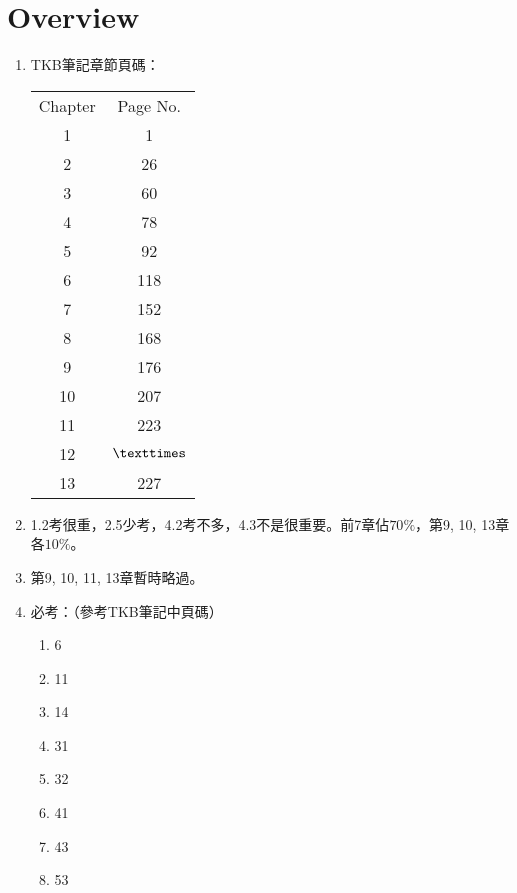 \section{Overview}

\begin{enumerate}
    \item TKB筆記\cite{4}章節頁碼：
    \begin{table}[H]
        \centering
        \begin{tabular}{|c|c|}
            \hline
            Chapter & Page No. \\
            \Xhline{2\arrayrulewidth}
            1 & 1 \\
            \hline
            2 & 26 \\
            \hline
            3 & 60 \\
            \hline
            4 & 78 \\
            \hline
            5 & 92 \\
            \hline
            6 & 118 \\
            \hline
            7 & 152 \\
            \hline
            8 & 168 \\
            \hline
            9 & 176 \\
            \hline
            10 & 207 \\
            \hline
            11 & 223 \\
            \hline
            12 & $\texttimes$ \\
            \hline
            13 & 227 \\
            \hline
        \end{tabular}
    \end{table}
    \item 1.2考很重，2.5少考，4.2考不多，4.3不是很重要。前7章佔$70\%$，第9, 10, 13章各$10\%$。
    \item 第9, 10, 11, 13章暫時略過。
    \item 必考：（參考TKB筆記\cite{4}中頁碼）
    \begin{enumerate}
        \item 6
        \item 11
        \item 14
        \item 31
        \item 32
        \item 41
        \item 43
        \item 53

\end{enumerate}
\end{enumerate}
